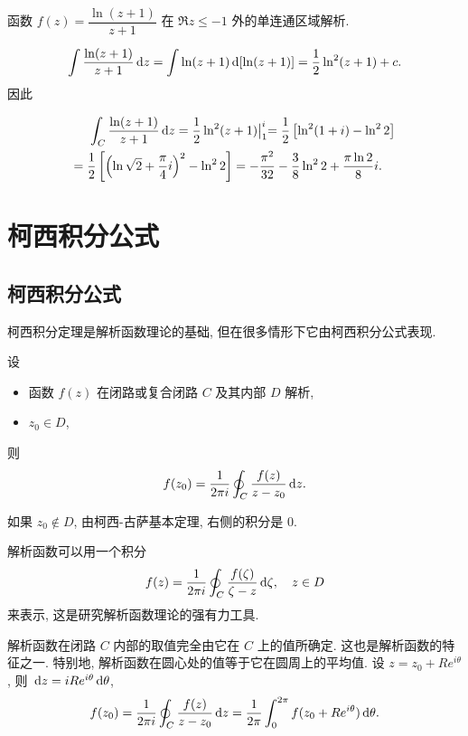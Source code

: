 \documentclass[nocolor,theme=doremi,lang=cn,11pt,chinese,twoside,openright,usesamecnt]{elegantbook}
\newenvironment{alertblock}[1]{\begin{tcolorbox}[alertstyle,title=#1]}{\end{tcolorbox}}
\newcommand\peq{\mathrel{\phantom{=}}} %
\begin{document}
\begin{solution}
	函数 $f(z)=\dfrac{\ln(z+1)}{z+1}$ 在 $\Re z\le -1$ 外的单连通区域解析.

	{
		\[\int\frac{\ln(z+1)}{z+1}\,\mathrm{d} z
		=\int\ln(z+1)\,\mathrm{d}[\ln(z+1)]=\frac{1}{2}\ln^2(z+1)+c.\]因此

		\begin{align*}
		&\peq\int_C\frac{\ln(z+1)}{z+1}\diff z=\half\ln^2(z+1)\big|_1^i
		{=\half\left[\ln^2(1+i)-\ln^22\right]}\\
		&{=\half\left[\left(\ln\sqrt2+\frac\pi4i\right)^2-\ln^22\right]
		=-\frac{\pi^2}{32}-\frac38\ln^22+\frac{\pi\ln2}{8}i.}
		\end{align*}}
\end{solution}

\section{柯西积分公式}

\subsection{柯西积分公式}

柯西积分定理是解析函数理论的基础, 但在很多情形下它由柯西积分公式表现.

\begin{alertblock}{柯西积分公式}
	设
	\begin{itemize}
		\item 函数 $f(z)$ 在闭路或复合闭路 $C$ 及其内部 $D$ 解析,
		\item $z_0\in D$,
	\end{itemize}
	则
		\[f(z_0)=\frac1{2\pi i}\oint_C\frac{f(z)}{z-z_0}\,\mathrm{d} z.\]
\end{alertblock}

如果 $z_0\notin D$, 由柯西-古萨基本定理, 右侧的积分是 $0$.

解析函数可以用一个积分
\[f(z)=\frac1{2\pi i}\oint_C\frac{f(\zeta)}{\zeta-z}\,\mathrm{d}\zeta,\quad z\in D\]
来表示, 这是研究解析函数理论的强有力工具.

解析函数在闭路 $C$ 内部的取值完全由它在 $C$ 上的值所确定. 这也是解析函数的特征之一.
特别地, 解析函数在圆心处的值等于它在圆周上的平均值.
设 $z=z_0+Re^{i\theta}$, 则 $\,\mathrm{d} z=iRe^{i\theta}\,\mathrm{d}\theta$,
\[f(z_0)=\frac1{2\pi i}\oint_C\frac{f(z)}{z-z_0}\,\mathrm{d} z=\frac1{2\pi}\int_0^{2\pi}f(z_0+Re^{i\theta})\,\mathrm{d}\theta.\]
\end{document}
